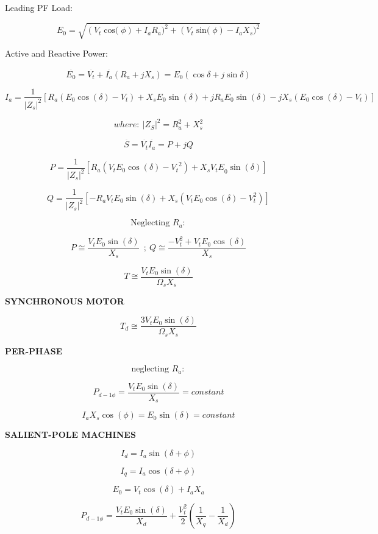 \begin{multicols}{2}
	Leading PF Load:
	
	\[E_{0} = \sqrt{{\left( V_{t}\operatorname{cos(}\phi \right) + I_{a}R_{a})}^{2} + {\left( V_{t}\operatorname{sin(}\phi \right) - I_{a}X_{s})}^{2}}\]
	
	Active and Reactive Power:
	
	\[\overset{\overline{}}{E_{0}} = \overset{\overline{}}{V_{t}} + \overset{\overline{}}{I_{a}}\left( R_{a} + jX_{s} \right) = E_{0}(\cos\delta + j\sin\delta)\]
	
	\[I_{a} = \frac{1}{\left| Z_{s} \right|^{2}}\left\lbrack R_{a}\left( E_{0}\cos\left( \delta \right) - V_{t} \right) + X_{s}E_{0}\sin\left( \delta \right) + jR_{a}E_{0}\sin\left( \delta \right) - jX_{s}\left( E_{0}\cos\left( \delta \right) - V_{t} \right) \right\rbrack\]
	
	\[where:\ \left| Z_{S} \right|^{2} = R_{a}^{2} + X_{s}^{2}\]
	
	\[\overset{\overline{}}{S} = \overset{\overline{}}{V_{t}}\overset{\overline{}}{I_{a}} = P + jQ\]
	
	\[P = \frac{1}{\left| Z_{s} \right|^{2}}\left\lbrack R_{a}\left( V_{t}E_{0}\cos\left( \delta \right) - {V_{t}}^{2} \right) + X_{s}{V_{t}E}_{0}\sin\left( \delta \right) \right\rbrack\]
	
	\[Q = \frac{1}{\left| Z_{s} \right|^{2}}\left\lbrack - R_{a}V_{t}E_{0}\sin\left( \delta \right) + X_{s}\left( V_{t}E_{0}\cos\left( \delta \right) - V_{t}^{2} \right) \right\rbrack\]
	
	\[\text{Neglecting\ }R_{a}:\]
	
	\[P \cong \frac{V_{t}E_{0}\sin\left( \delta \right)}{X_{s}}\ \ ;\ Q \cong \frac{{- V}_{t}^{2} + V_{t}E_{0}\cos\left( \delta \right)}{X_{s}}\]
	
	\[T \cong \frac{V_{t}E_{0}\sin\left( \delta \right)}{\Omega_{s}X_{s}}\]
	
	\textbf{SYNCHRONOUS MOTOR}
	
	\[T_{d} \cong \frac{3V_{t}E_{0}\sin\left( \delta \right)}{\Omega_{s}X_{s}}\]
	
	\textbf{PER-PHASE}
	
	\[\text{neglecting\ }R_{a}:\]
	
	\[P_{d - 1\phi} = \frac{V_{t}E_{0}\sin{(\delta)}}{X_{s}} = constant\]
	
	\[I_{a}X_{s}\cos\left( \phi \right) = E_{0}\sin\left( \delta \right) = constant\]
	
	\textbf{SALIENT-POLE MACHINES}
	
	\[I_{d} = I_{a}\sin\left( \delta + \phi \right)\]
	
	\[I_{q} = I_{a}\cos\left( \delta + \phi \right)\]
	
	\[E_{0} = V_{t}\cos\left( \delta \right) + I_{a}X_{a}\]
	
	\[P_{d - 1\phi} = \frac{V_{t}E_{0}\sin\left( \delta \right)}{X_{d}} + \frac{V_{t}^{2}}{2}\left( \frac{1}{X_{q}} - \frac{1}{X_{d}} \right)\]
\end{multicols}